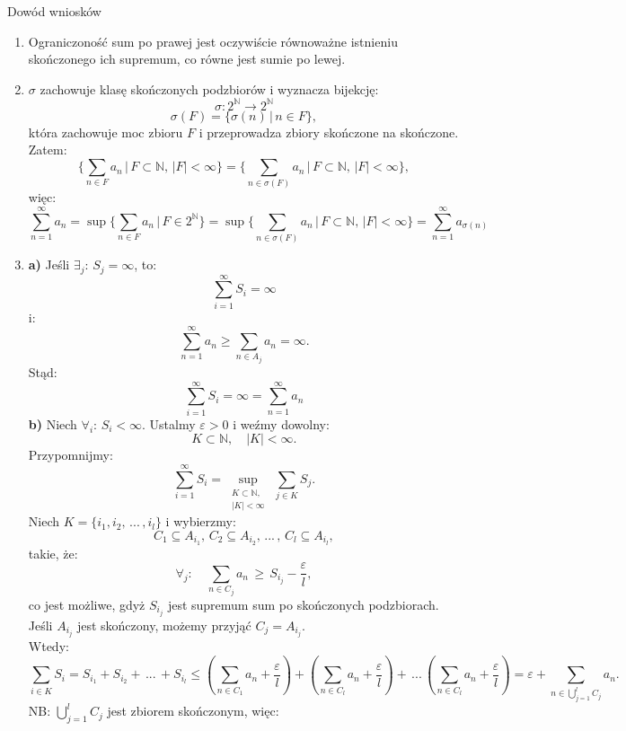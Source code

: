 \documentclass{article}
\newcommand{\N}{\mathbb{N}}
\newcommand{\oo}{\infty}
\begin{document}
    \begin{dow}{Dowód wniosków}
        \begin{enumerate}
            \item Ograniczoność sum po prawej jest oczywiście równoważne istnieniu skończonego ich supremum, co równe jest sumie po lewej.
            \item $\sigma$ zachowuje klasę skończonych podzbiorów i wyznacza bijekcję:
            \[\sigma: 2^{\N} \rightarrow 2^{\N}\]
            \[\sigma(F) = \{ \sigma(n)\,|\, n \in F \},\]
            która zachowuje moc zbioru $F$ i przeprowadza zbiory skończone na skończone. Zatem:
            \[\biggl\{ \sum_{n \in F} a_n \, \bigg| \, F \subset \N, \, |F| < \oo\biggr\} = \biggl\{ \sum_{n \in \sigma(F)} a_{n} \, \bigg| \, F \subset \N, \, |F| < \oo\biggr\}, \]
            więc:
            \[ \sum_{n=1}^{\oo} a_n = \sup{\biggl\{ \sum_{n \in F} a_n \, \bigg| \, F \in 2^{\N}\biggr\}}  = \sup{\biggl\{ \sum_{n \in \sigma(F)} a_{n} \, \bigg| \, F \subset \N, \, |F| < \oo\biggr\}} = \sum_{n=1}^{\oo} a_{\sigma(n)}\]
            \item 
            \textbf{a)} Jeśli $\exists_j: \, S_j = \oo$, to:
            \[\sum_{i=1}^{\oo} S_i = \oo\]
            i:
            \[\sum_{n=1}^{\oo} a_n \geqslant \sum_{n \in A_j} a_n = \oo.\]
            Stąd:
            \[\sum_{i=1}^{\oo} S_i = \oo = \sum_{n=1}^{\oo} a_n\]
            \textbf{b)} Niech $\forall_{i}: \, S_i < \oo$. Ustalmy $\varepsilon > 0$ i weźmy dowolny: 
            \[K \subset \N, \quad |K| < \oo.\]
            Przypomnijmy:
            \[\sum_{i=1}^{\oo}S_i = \sup_{\substack{K \subset \N, \\ |K| < \oo}} \, \sum_{j \in K} S_j.\]
            Niech $K = \{ i_1, i_2,\, ...\,, i_l \}$ i wybierzmy:
            \[C_1 \subseteq A_{i_1}, \, C_2 \subseteq A_{i_2}, \, ...\, , \, C_l \subseteq A_{i_l}, \]
            takie, że:
            \[\forall_j: \quad \sum_{n \in C_j} a_n \,  \geqslant \, S_{i_j} - \frac{\varepsilon}{l},\]
            co jest możliwe, gdyż $S_{i_j}$ jest supremum sum po skończonych podzbiorach. Jeśli $A_{i_j}$ jest skończony, możemy przyjąć $C_j = A_{i_j}$. \\
            Wtedy:
            \[\sum_{i \in K} S_i = S_{i_1} + S_{i_2} + \, ... \, + S_{i_l} \leqslant \left( \sum_{n\in C_1} a_n + \frac{\varepsilon}{l} \right) + \left( \sum_{n\in C_l} a_n + \frac{\varepsilon}{l} \right) + \, ... \, \left( \sum_{n\in C_l} a_n + \frac{\varepsilon}{l} \right) = \varepsilon + \sum_{n \in \bigcup_{j=1}^l C_j} a_n.\]
            NB: $\bigcup_{j=1}^l C_j$ jest zbiorem skończonym, więc:

\end{enumerate}
\end{dow}
\end{document}
